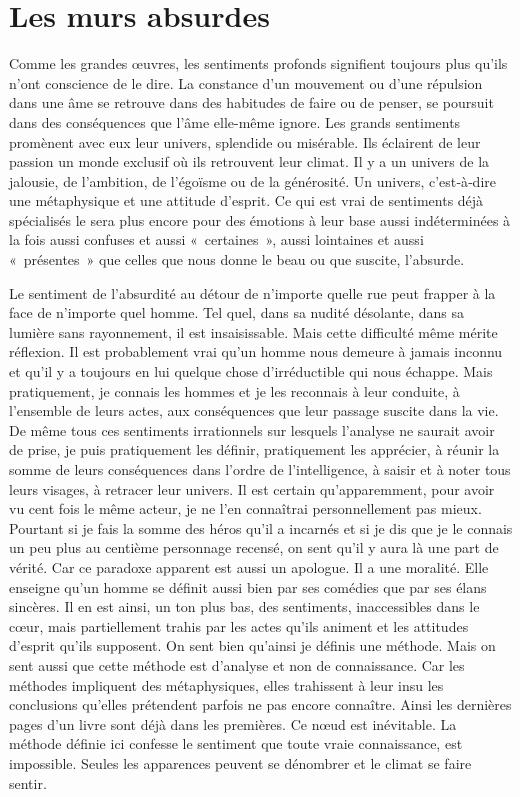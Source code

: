 \documentclass{book}
\begin{document}
\section{Les murs absurdes}

Comme les grandes œuvres, les sentiments profonds signifient toujours plus qu'ils n'ont conscience de le dire. La constance d'un mouvement ou d'une répulsion dans une âme se retrouve dans des habitudes de faire ou de penser, se poursuit dans des conséquences que l'âme elle-même ignore. Les grands sentiments promènent avec eux leur univers, splendide ou misérable. Ils éclairent de leur passion un monde exclusif où ils retrouvent leur climat. Il y a un univers de la jalousie, de l'ambition, de l'égoïsme ou de la générosité. Un univers, c'est‑à‑dire une métaphysique et une attitude d'esprit. Ce qui est vrai de sentiments déjà spécialisés le sera plus encore pour des émotions à leur base aussi indéterminées à la fois aussi confuses et aussi « certaines », aussi lointaines et aussi « présentes » que celles que nous donne le beau ou que suscite, l'absurde.

Le sentiment de l'absurdité au détour de n'importe quelle rue peut frapper à la face de n'importe quel homme. Tel quel, dans sa nudité désolante, dans sa lumière sans rayonnement, il est insaisissable. Mais cette difficulté même mérite réflexion. Il est probablement vrai qu'un homme nous demeure à jamais inconnu et qu'il y a toujours en lui quelque chose d'irréductible qui nous échappe. Mais pratiquement, je connais les hommes et je les reconnais à leur conduite, à l'ensemble de leurs actes, aux conséquences que leur passage suscite dans la vie. De même tous ces sentiments irrationnels sur lesquels l'analyse ne saurait avoir de prise, je puis pratiquement les définir, pratiquement les apprécier, à réunir la somme de leurs conséquences dans l'ordre de l'intelligence, à saisir et à noter tous leurs visages, à retracer leur univers. Il est certain qu'apparemment, pour avoir vu cent fois le même acteur, je ne l'en connaîtrai personnellement pas mieux. Pourtant si je fais la somme des héros qu'il a incarnés et si je dis que je le connais un peu plus au centième personnage recensé, on sent qu'il y aura là une part de vérité. Car ce paradoxe apparent est aussi un apologue. Il a une moralité. Elle enseigne qu'un homme se définit aussi bien par ses comédies que par ses élans sincères. Il en est ainsi, un ton plus bas, des sentiments, inaccessibles dans le cœur, mais partiellement trahis par les actes qu'ils animent et les attitudes d'esprit qu'ils supposent. On sent bien qu'ainsi je définis une méthode. Mais on sent aussi que cette méthode est d'analyse et non de connaissance. Car les méthodes impliquent des métaphysiques, elles trahissent à leur insu les conclusions qu'elles prétendent parfois ne pas encore connaître. Ainsi les dernières pages d'un livre sont déjà dans les premières. Ce nœud est inévitable. La méthode définie ici confesse le sentiment que toute vraie connaissance, est impossible. Seules les apparences peuvent se dénombrer et le climat se faire sentir.
\end{document}
